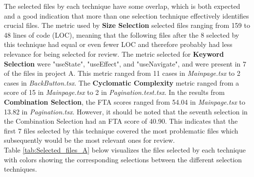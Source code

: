The selected files by each technique have some overlap, which is both expected and a good indication that more than one selection technique effectively identifies crucial files.
The metric used by \textbf{Size Selection} selected files ranging from 159 to 48 lines of code (LOC), meaning that the following files after the 8 selected by this technique had equal or even fewer LOC and therefore probably had less relevance for being selected for review.
The metric selected for \textbf{Keyword Selection} were "useState", "useEffect", and "useNavigate", and were present in 7 of the files in project A. This metric ranged from 11 cases in \textit{Mainpage.tsx} to 2 cases in \textit{BackButton.tsx}.
The \textbf{Cyclomatic Complexity} metric ranged from a score of 15 in \textit{Mainpage.tsx} to 2 in \textit{Pagination.test.tsx}.
In the results from \textbf{Combination Selection}, the FTA scores ranged from 54.04 in \textit{Mainpage.tsx} to 13.82 in \textit{Pagination.tsx}. However, it should be noted that the seventh selection in the Combination Selection had an FTA score of 40.90. This indicates that the first 7 files selected by this technique covered the most problematic files which subsequently would be the most relevant ones for review. \\

Table \ref{tab:Selected_files_A} below visualizes the files selected by each technique with colors showing the corresponding selections between the different selection techniques.

